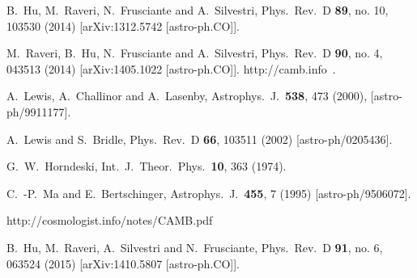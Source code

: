 \documentclass[prd,nofootinbib,showpacs]{revtex4}
\begin{document}
{\begin{thebibliography}{999}
  B.~Hu, M.~Raveri, N.~Frusciante and A.~Silvestri,
  Phys.\ Rev.\ D {\bf 89}, no. 10, 103530 (2014)
  [arXiv:1312.5742 [astro-ph.CO]].

  M.~Raveri, B.~Hu, N.~Frusciante and A.~Silvestri,
  Phys.\ Rev.\ D {\bf 90}, no. 4, 043513 (2014)
  [arXiv:1405.1022 [astro-ph.CO]].
http://camb.info \,.

  A.~Lewis, A.~Challinor and A.~Lasenby,
  Astrophys.\ J.\  {\bf 538}, 473 (2000),
  [astro-ph/9911177].
	
  A.~Lewis and S.~Bridle,
  Phys.\ Rev.\ D {\bf 66}, 103511 (2002)
  [astro-ph/0205436].
	
  G.~W.~Horndeski,
  Int.\ J.\ Theor.\ Phys.\  {\bf 10}, 363 (1974).
	
  C.~-P.~Ma and E.~Bertschinger,
  Astrophys.\ J.\  {\bf 455}, 7 (1995)
  [astro-ph/9506072].
	
	
http://cosmologist.info/notes/CAMB.pdf

  B.~Hu, M.~Raveri, A.~Silvestri and N.~Frusciante,
  Phys.\ Rev.\ D {\bf 91}, no. 6, 063524 (2015)
  [arXiv:1410.5807 [astro-ph.CO]].



\end{thebibliography}}
\end{document}
